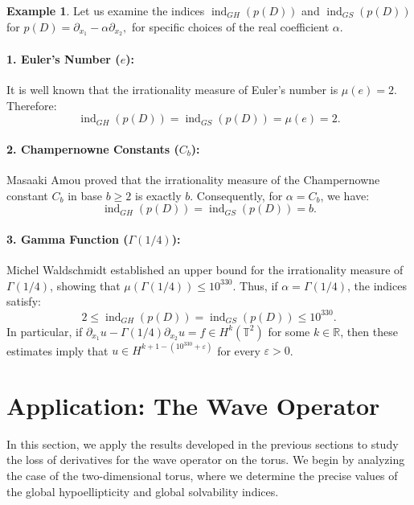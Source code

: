 \documentclass[11pt]{amsart}
\numberwithin{equation}{section}
\theoremstyle{definition}
\newtheorem{example}[theorem]{Example}
\begin{document}
	\begin{example}
		Let us examine the indices $\operatorname{ind}_{GH}(p(D))$ and $\operatorname{ind}_{GS}(p(D))$ for 
		\(p(D) = \partial_{x_1} - \alpha \partial_{x_2},\) for specific choices of the real coefficient $\alpha$.
		
		\paragraph{\bf 1. Euler's Number ($e$):} 
		It is well known that the irrationality measure of Euler's number is $\mu(e) = 2$. Therefore:
		\[
		\operatorname{ind}_{GH}(p(D)) = \operatorname{ind}_{GS}(p(D)) = \mu(e) = 2.
		\]
		
		\paragraph{\bf 2. Champernowne Constants ($C_b$):} 
		Masaaki Amou \cite{AMOU1991231} proved that the irrationality measure of the Champernowne constant $C_b$ in base $b \geq 2$ is exactly $b$. Consequently, for $\alpha = C_b$, we have:
		\[
		\operatorname{ind}_{GH}(p(D)) = \operatorname{ind}_{GS}(p(D)) = b.
		\]
		
		\paragraph{\bf 3. Gamma Function ($\Gamma(1/4)$):} 
		Michel Waldschmidt \cite{Waldschmidt2008} established an upper bound for the irrationality measure of $\Gamma(1/4)$, showing that $\mu(\Gamma(1/4)) \leq 10^{330}$. Thus, if $\alpha = \Gamma(1/4)$, the indices satisfy:
		\[
		2 \leq \operatorname{ind}_{GH}(p(D)) = \operatorname{ind}_{GS}(p(D)) \leq 10^{330}.
		\]
		In particular, if $\partial_{x_1}u - \Gamma(1/4) \partial_{x_2}u = f \in H^k(\mathbb{T}^2)$ for some $k \in \mathbb{R}$, then these estimates imply that $u \in H^{k + 1 - (10^{330} + \varepsilon)}$ for every $\varepsilon > 0$.
	\end{example}
	
		

\section{Application: The Wave Operator}
	
	In this section, we apply the results developed in the previous sections to study the loss of derivatives for the wave operator on the torus. We begin by analyzing the case of the two-dimensional torus, where we determine the precise values of the global hypoellipticity and global solvability indices. 
	
\end{document}
